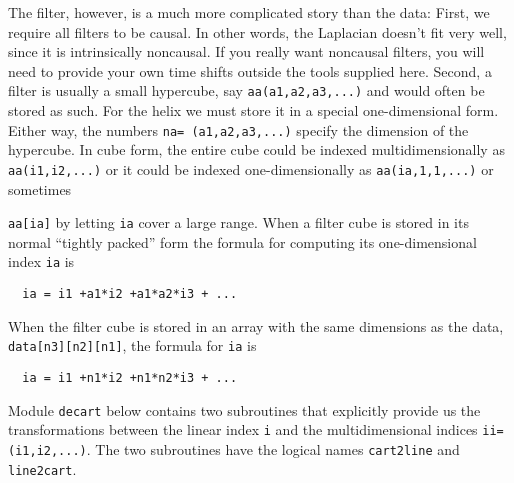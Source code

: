 \par
The filter, however, is a much more complicated story than the data:
First, we require all filters to be causal.
In other words, the Laplacian doesn't fit very well,
since it is intrinsically noncausal.
If you really want noncausal filters,
you will need to provide your own time shifts outside the tools supplied here.
Second, a filter is usually a small hypercube, say
\texttt{aa(a1,a2,a3,...)}
and would often be stored as such.
For the helix we must store it in a special one-dimensional form.
Either way, the numbers
\texttt{na= (a1,a2,a3,...)}
specify the dimension of the hypercube.
In cube form, the entire cube could be indexed
multidimensionally as \texttt{aa(i1,i2,...)} or it could be indexed
one-dimensionally as \texttt{aa(ia,1,1,...)} or sometimes
\begin{comment}
\footnote{
        Some programming minutia:
        Fortran77 does not allow you to refer to an array
        by both its cartesian coordinates
        and by its linear subscript in the same subroutine.
        To access it both ways, you need a subroutine call,
        or you dimension it as 
        \texttt{data(n1,n2,...)}
        and then you refer to it as
        \texttt{data(id,1,1,...)}.
        Fortran90 follows the same rule outside modules.
        Where modules use other modules,
        the compiler does not allow you to refer
        to data both ways,
        unless the array is declared as
        \texttt{allocatable}.
        }
\end{comment}
\texttt{aa[ia]} by letting \texttt{ia} cover a large range.
When a filter cube is stored in its normal ``tightly packed'' form
the formula for computing
its one-dimensional index
\texttt{ia} is
\begin{verbatim}
  ia = i1 +a1*i2 +a1*a2*i3 + ...
\end{verbatim}
When the filter cube is stored in an array
with the same dimensions as the data,
\texttt{data[n3][n2][n1]},
the formula for \texttt{ia} is
\begin{verbatim}
  ia = i1 +n1*i2 +n1*n2*i3 + ...
\end{verbatim}

\par
Module \texttt{decart} below contains
two subroutines that
explicitly provide us the transformations
between the linear index
\texttt{i}
and the multidimensional indices
\texttt{ii= (i1,i2,...)}.
The two subroutines have the logical names
\texttt{cart2line} and
\texttt{line2cart}.

